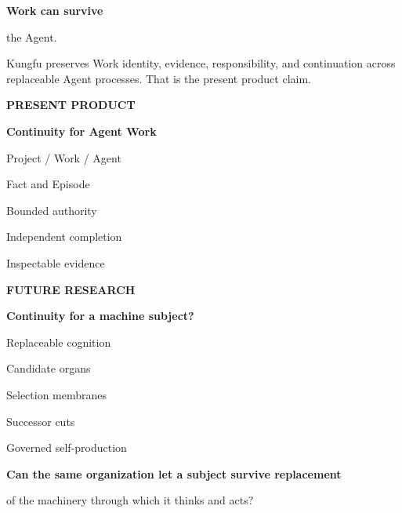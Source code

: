 \documentclass[10pt]{article}
\begin{document}
\vspace{0.75in}
{\sffamily\bfseries\fontsize{36}{39}\selectfont\color{White}
Work can survive\par
the Agent.\par}

\vspace{0.25in}
{\sffamily\fontsize{14}{19}\selectfont\color{PaperCool}
Kungfu preserves Work identity, evidence, responsibility, and continuation
across replaceable Agent processes. That is the present product claim.\par}

\vspace{0.52in}
\begin{minipage}[t]{0.46\textwidth}
  \begin{darkcard}
    {\sffamily\bfseries\footnotesize\color{Cyan}PRESENT PRODUCT}\par
    {\sffamily\bfseries\fontsize{17}{19}\selectfont\color{White}
    Continuity for Agent Work}\par
    \vspace{0.1in}
    {\small\color{PaperCool}
    Project / Work / Agent\par
    Fact and Episode\par
    Bounded authority\par
    Independent completion\par
    Inspectable evidence}
  \end{darkcard}
\end{minipage}
\hfill
\begin{minipage}[t]{0.46\textwidth}
  \begin{darkcard}
    {\sffamily\bfseries\footnotesize\color{Warn}FUTURE RESEARCH}\par
    {\sffamily\bfseries\fontsize{17}{19}\selectfont\color{White}
    Continuity for a machine subject?}\par
    \vspace{0.1in}
    {\small\color{PaperCool}
    Replaceable cognition\par
    Candidate organs\par
    Selection membranes\par
    Successor cuts\par
    Governed self-production}
  \end{darkcard}
\end{minipage}

\vspace{0.48in}
\begin{center}
  {\sffamily\bfseries\fontsize{19}{23}\selectfont\color{Cyan}
  Can the same organization let a subject survive replacement\par
  of the machinery through which it thinks and acts?}
\end{center}
\end{document}
